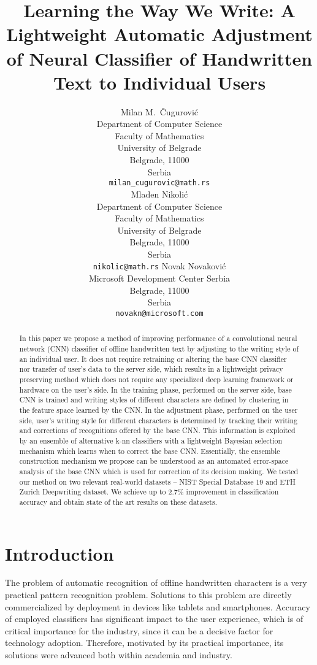 \documentclass{article}
\title{Learning the Way We Write: A Lightweight Automatic Adjustment of %
Neural Classifier of Handwritten Text to Individual Users}
\author{%
  Milan M.~Čugurović\\
  Department of Computer Science\\
  Faculty of Mathematics\\
  University of Belgrade\\
  Belgrade, 11000\\
  Serbia\\
  \texttt{milan\_cugurovic@math.rs} \\
  \And
  Mladen Nikolić\\
  Department of Computer Science\\
  Faculty of Mathematics\\
  University of Belgrade\\
  Belgrade, 11000\\
  Serbia\\
  \texttt{nikolic@math.rs}
  \And
  Novak Novaković \\
  Microsoft Development Center Serbia\\
  Belgrade, 11000\\
  Serbia\\
  \texttt{novakn@microsoft.com}
}
\begin{document}
\maketitle

\begin{abstract}
  In this paper we propose a method of improving performance of a convolutional neural network (CNN) classifier of offline handwritten text by adjusting to the writing style of an individual user. It does not require retraining or altering the base CNN classifier nor transfer of user's data to the server side, which results in a lightweight privacy preserving method which does not require any specialized deep learning framework or hardware on the user's side. In the training phase, performed on the server side, base CNN is trained and writing styles of different characters are defined by clustering in the feature space learned by the CNN. In the adjustment phase, performed on the user side, user's writing style for different characters is determined by tracking their writing and corrections of recognitions offered by the base CNN. This information is exploited by an ensemble of alternative k-nn classifiers with a lightweight Bayesian selection mechanism which learns when to correct the base CNN. Essentially, the ensemble construction mechanism we propose can be understood as an automated error-space analysis of the base CNN which is used for correction of its decision making.
  We tested our method on two relevant real-world datasets -- NIST Special Database 19 and ETH Zurich Deepwriting dataset. We achieve up to 2.7\% improvement in classification accuracy and obtain state of the art results on these datasets.
\end{abstract}

\section{Introduction}
The problem of automatic recognition of offline handwritten characters is a very practical pattern recognition problem. Solutions to this problem are directly commercialized  by deployment in devices like tablets and smartphones.
Accuracy of employed classifiers has significant impact to the user experience, which is of critical importance for the industry, since it can be a decisive factor for technology adoption.
Therefore, motivated by its practical importance, its solutions were advanced both within academia and industry.
\end{document}
